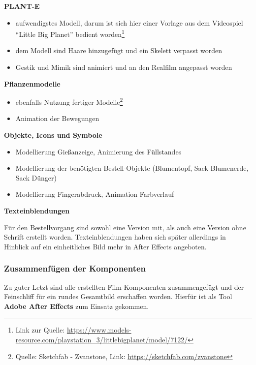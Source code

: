 \textbf{PLANT-E}

\begin{itemize}
\tightlist
\item
  aufwendigstes Modell, darum ist sich hier einer Vorlage aus dem
  Videospiel ``Little Big Planet'' bedient worden\footnote{Link zur
    Quelle:
    \url{https://www.models-resource.com/playstation_3/littlebigplanet/model/7122/}}
\item
  dem Modell sind Haare hinzugefügt und ein Skelett verpasst worden
\item
  Gestik und Mimik sind animiert und an den Realfilm angepasst worden
\end{itemize}

\textbf{Pflanzenmodelle}

\begin{itemize}
\tightlist
\item
  ebenfalls Nutzung fertiger Modelle\footnote{Quelle: Sketchfab -
    Zvanstone, Link: \url{https://sketchfab.com/zvanstone}}
\item
  Animation der Bewegungen
\end{itemize}

\textbf{Objekte, Icons und Symbole}

\begin{itemize}
\tightlist
\item
  Modellierung Gießanzeige, Animierung des Füllstandes
\item
  Modellierung der benötigten Bestell-Objekte (Blumentopf, Sack
  Blumenerde, Sack Dünger)
\item
  Modellierung Fingerabdruck, Animation Farbverlauf
\end{itemize}

\textbf{Texteinblendungen}

Für den Bestellvorgang sind sowohl eine Version mit, als auch eine
Version ohne Schrift erstellt worden. Texteinblendungen haben sich
später allerdings in Hinblick auf ein einheitliches Bild mehr in After
Effects angeboten.

\hypertarget{zusammenfuxfcgen-der-komponenten}{%
\subsubsection{Zusammenfügen der
Komponenten}\label{zusammenfuxfcgen-der-komponenten}}

Zu guter Letzt sind alle erstellten Film-Komponenten zusammengefügt und
der Feinschliff für ein rundes Gesamtbild erschaffen worden. Hierfür ist
als Tool \textbf{Adobe After Effects} zum Einsatz gekommen.

